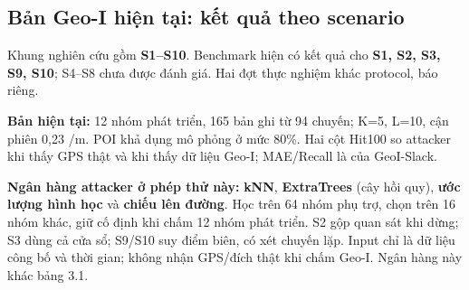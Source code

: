\documentclass[10pt,a4paper]{article}
\begin{document}
\clearpage
\subsection{Bản Geo-I hiện tại: kết quả theo scenario}\label{sub:3.2}
Khung nghiên cứu gồm \textbf{S1–S10}. Benchmark hiện có kết quả cho \textbf{S1, S2, S3, S9, S10}; S4–S8 chưa được đánh giá. Hai đợt thực nghiệm khác protocol, báo riêng.

\textbf{Bản hiện tại:} 12 nhóm phát triển, 165 bản ghi từ 94 chuyến; K=5, L=10, cận phiên 0,23 /m. POI khả dụng mô phỏng ở mức 80\%. Hai cột Hit100 so attacker khi thấy GPS thật và khi thấy dữ liệu Geo-I; MAE/Recall là của GeoI-Slack.

\textbf{Ngân hàng attacker ở phép thử này:} \textbf{kNN}, \textbf{ExtraTrees} (cây hồi quy), \textbf{ước lượng hình học} và \textbf{chiếu lên đường}. Học trên 64 nhóm phụ trợ, chọn trên 16 nhóm khác, giữ cố định khi chấm 12 nhóm phát triển. S2 gộp quan sát khi dừng; S3 dùng cả cửa sổ; S9/S10 suy điểm biên, có xét chuyến lặp. Input chỉ là dữ liệu công bố và thời gian; không nhận GPS/đích thật khi chấm Geo-I. Ngân hàng này khác bảng 3.1.
\end{document}
